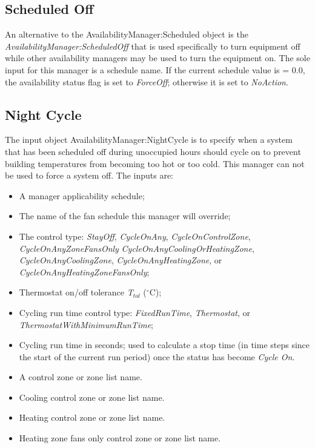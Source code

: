 \subsection{Scheduled Off}\label{scheduled-off}

An alternative to the AvailabilityManager:Scheduled object is the \emph{AvailabilityManager:ScheduledOff} that is used specifically to turn equipment off while other availability managers may be used to turn the equipment on. The sole input for this manager is a schedule name. If the current schedule value is = 0.0, the availability status flag is set to \emph{ForceOff}; otherwise it is set to \emph{NoAction}.

\subsection{Night Cycle}\label{night-cycle}

The input object AvailabilityManager:NightCycle is to specify when a system that has been scheduled off during unoccupied hours should cycle on to prevent building temperatures from becoming too hot or too cold. This manager can not be used to force a system off. The inputs are:

\begin{itemize}
\item  A manager applicability schedule;

\item  The name of the fan schedule this manager will override;

\item  The control type: \emph{StayOff}, \emph{CycleOnAny}, \emph{CycleOnControlZone}, \emph{CycleOnAnyZoneFansOnly} \emph{CycleOnAnyCoolingOrHeatingZone}, \emph{CycleOnAnyCoolingZone}, \emph{CycleOnAnyHeatingZone}, or \emph{CycleOnAnyHeatingZoneFansOnly};

\item  Thermostat on/off tolerance \emph{T\(_{tol}\)} (\(^{\circ}\)C);

\item  Cycling run time control type: \emph{FixedRunTime}, \emph{Thermostat}, or \emph{ThermostatWithMinimumRunTime};

\item  Cycling run time in seconds; used to calculate a stop time (in time steps since the start of the current run period) once the status has become \emph{Cycle On}.

\item  A control zone or zone list name.

\item  Cooling control zone or zone list name.

\item  Heating control zone or zone list name.

\item  Heating zone fans only control zone or zone list name.

\end{itemize}

